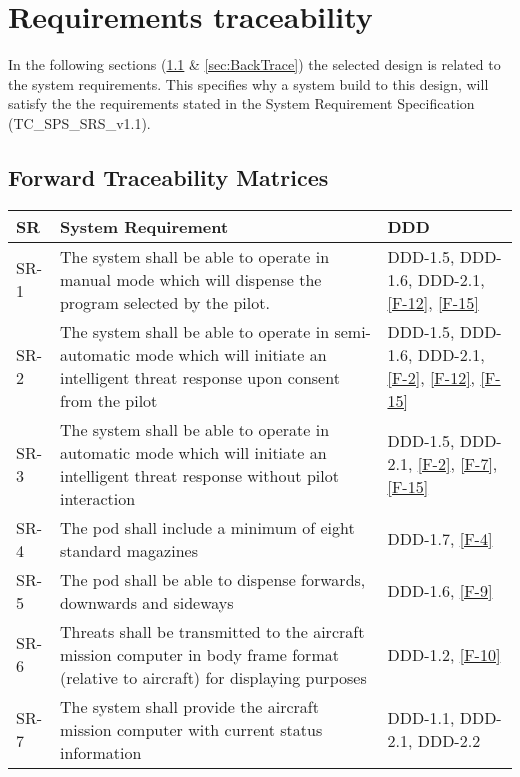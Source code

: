 \documentclass[Main]{subfiles}
\begin{document}
\chapter{Requirements traceability}

In the following sections (\ref{sec:ForTrace} \& \ref{sec:BackTrace}) the selected design is related to the system requirements.
This specifies why a system build to this design, will satisfy the the requirements stated in the System Requirement Specification (TC\_SPS\_SRS\_v1.1).


\section{Forward Traceability Matrices}\label{sec:ForTrace}



\begin{longtable}{p{} p{} p{}} \hline
SR & System Requirement & DDD \\\hline

SR-1 & The system shall be able to operate in manual mode which will dispense the program selected by the pilot. & DDD-1.5, DDD-1.6, DDD-2.1, \ref{F-12}, \ref{F-15} \\

SR-2 & The system shall be able to operate in semi-automatic mode which will initiate an intelligent threat response upon consent from the pilot & DDD-1.5, DDD-1.6, DDD-2.1, \ref{F-2}, \ref{F-12}, \ref{F-15} \\

SR-3 & The system shall be able to operate in automatic mode which will initiate an intelligent threat response without pilot interaction & DDD-1.5, DDD-2.1, \ref{F-2}, \ref{F-7}, \ref{F-15} \\

SR-4 & The pod shall include a minimum of eight standard magazines & DDD-1.7, \ref{F-4} \\

SR-5 & The pod shall be able to dispense forwards, downwards and sideways & DDD-1.6, \ref{F-9} \\

SR-6 & Threats shall be transmitted to the aircraft mission computer in body frame format (relative to aircraft) for displaying purposes &  DDD-1.2, \ref{F-10}\\

SR-7 & The system shall provide the aircraft mission computer with current status information & DDD-1.1, DDD-2.1, DDD-2.2 \\


\end{longtable}
\end{document}
